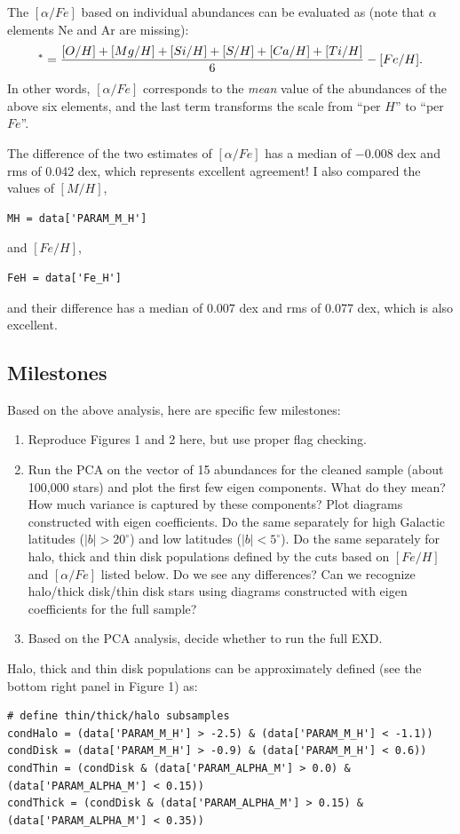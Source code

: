 \documentclass[12pt,preprint]{aastex}
\begin{document}
The $[\alpha/Fe]$ based on individual abundances can be evaluated as (note that $\alpha$ elements
Ne and Ar are missing): 
\begin{equation}
       [\alpha/Fe]^\ast= {[O/H]+[Mg/H]+[Si/H]+[S/H]+[Ca/H]+[Ti/H] \over 6} - [Fe/H].
\end{equation}
In other words, $[\alpha/Fe]$ corresponds to the {\it mean} value of the abundances of the above six elements, 
and the last term transforms the scale from ``per $H$'' to ``per $Fe$''. 

The difference of the two estimates of $[\alpha/Fe]$ has a median of $-0.008$ dex and rms of 0.042 dex, 
which represents excellent agreement! I also compared the values of $[M/H]$, 
\begin{verbatim}
MH = data['PARAM_M_H']
\end{verbatim}
and $[Fe/H]$, 
\begin{verbatim}
FeH = data['Fe_H']
\end{verbatim}
and their difference has a median of $0.007$ dex and rms of 0.077 dex, 
which is also excellent.

\subsection{Milestones}

Based on the above analysis, here are specific few milestones: 

\begin{enumerate}
\item Reproduce Figures 1 and 2 here, but use proper flag checking. 
\item Run the PCA on the vector of 15 abundances for the cleaned sample (about 100,000 stars) and
plot the first few eigen components. What do they mean? How much variance is captured by these
components? Plot diagrams constructed with eigen coefficients. Do the same separately for high Galactic latitudes ($|b|>20^\circ$) 
and low latitudes  ($|b|<5^\circ$). Do the same separately for halo, thick and thin disk populations defined
by the cuts based on $[Fe/H]$ and $[\alpha/Fe]$ listed below. Do we see any differences? Can we
recognize halo/thick disk/thin disk stars using diagrams constructed with eigen coefficients for
the full sample? 
\item Based on the PCA analysis, decide whether to run the full EXD.  
\end{enumerate} 


Halo, thick and thin disk populations can be approximately defined (see the bottom right panel
in Figure 1) as:
\begin{verbatim}
# define thin/thick/halo subsamples
condHalo = (data['PARAM_M_H'] > -2.5) & (data['PARAM_M_H'] < -1.1))
condDisk = (data['PARAM_M_H'] > -0.9) & (data['PARAM_M_H'] < 0.6))
condThin = (condDisk & (data['PARAM_ALPHA_M'] > 0.0) & (data['PARAM_ALPHA_M'] < 0.15)) 
condThick = (condDisk & (data['PARAM_ALPHA_M'] > 0.15) & (data['PARAM_ALPHA_M'] < 0.35)) 
\end{verbatim}
\end{document}
